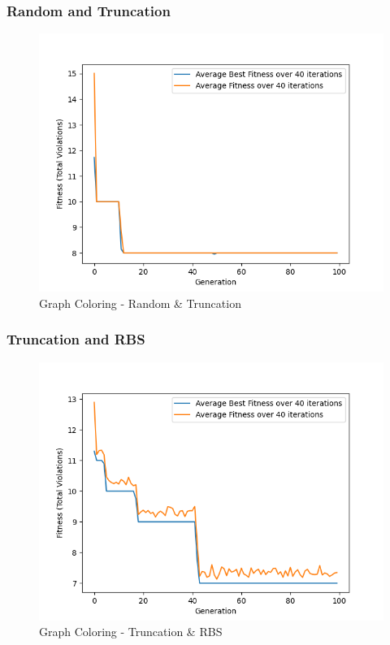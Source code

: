 \documentclass[11pt, letterpaper]{article}
\begin{document}
\subsubsection {Random and Truncation}
\begin{figure}[H]
    \centering
    \includegraphics[scale = 0.6]{images/graphcoloring_rd_tr.png}
    \caption {Graph Coloring - Random \& Truncation}
    \label {fig:gcRT}
\end{figure}

\subsubsection {Truncation and RBS}
\begin{figure}[H]
    \centering
    \includegraphics[scale = 0.6]{images/graphcoloring_tr_rb.png}
    \caption {Graph Coloring - Truncation \& RBS}
    \label {fig:gcTR}
\end{figure}
\end{document}
